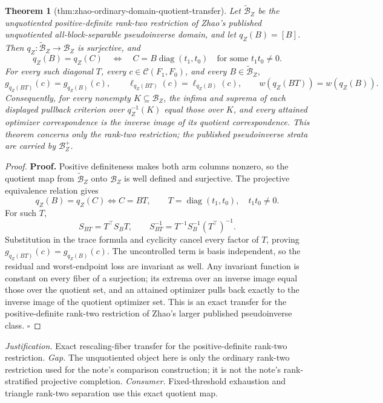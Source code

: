 \documentclass{article}
\newtheorem{theorem}{Theorem}
\begin{document}
\begin{theorem}[thm:zhao-ordinary-domain-quotient-transfer]\label{thm:zhao-ordinary-domain-quotient-transfer}
Let \(\widetilde{\mathcal B}_Z\) be the unquotiented positive-definite rank-two restriction of Zhao's published unquotiented all-block-separable pseudoinverse domain, and let \(q_Z(B)=[B]\).  Then \(q_Z:\widetilde{\mathcal B}_Z\to\mathcal B_Z\) is surjective, and
\[
q_Z(B)=q_Z(C)
\quad\Longleftrightarrow\quad
C=B\operatorname{diag}(t_1,t_0)
\quad\text{for some }t_1t_0\ne0.
\]
For every such diagonal \(T\), every \(c\in\mathcal C(F_1,F_0)\), and every \(B\in\widetilde{\mathcal B}_Z\),
\[
g_{q_Z(BT)}(c)=g_{q_Z(B)}(c),\qquad
\ell_{q_Z(BT)}(c)=\ell_{q_Z(B)}(c),\qquad
w(q_Z(BT))=w(q_Z(B)).
\]
Consequently, for every nonempty \(K\subseteq\mathcal B_Z\), the infima and suprema of each displayed pullback criterion over \(q_Z^{-1}(K)\) equal those over \(K\), and every attained optimizer correspondence is the inverse image of its quotient correspondence.  This theorem concerns only the rank-two restriction; the published pseudoinverse strata are carried by \(\mathcal B_Z^+\).
\end{theorem}
\begin{proof}
\textbf{Proof.}
Positive definiteness makes both arm columns nonzero, so the quotient map from \(\widetilde{\mathcal B}_Z\) onto \(\mathcal B_Z\) is well defined and surjective.  The projective equivalence relation gives
\[
q_Z(B)=q_Z(C)\Longleftrightarrow C=BT,
\qquad T=\operatorname{diag}(t_1,t_0),\quad t_1t_0\ne0.
\tag{1}
\]
For such \(T\),
\[
S_{BT}=T^\top S_BT,
\qquad S_{BT}^{-1}=T^{-1}S_B^{-1}(T^\top)^{-1}.
\tag{2}
\]
Substitution in the trace formula and cyclicity cancel every factor of \(T\), proving \(g_{q_Z(BT)}(c)=g_{q_Z(B)}(c)\).  The uncontrolled term is basis independent, so the residual and worst-endpoint loss are invariant as well.  Any invariant function is constant on every fiber of a surjection; its extrema over an inverse image equal those over the quotient set, and an attained optimizer pulls back exactly to the inverse image of the quotient optimizer set.  This is an exact transfer for the positive-definite rank-two restriction of Zhao's larger published pseudoinverse class. \(\square\)
\end{proof}
\par\smallskip\noindent \textit{Justification.} Exact rescaling-fiber transfer for the positive-definite rank-two restriction. \textit{Gap.} The unquotiented object here is only the ordinary rank-two restriction used for the note's comparison construction; it is not the note's rank-stratified projective completion. \textit{Consumer.} Fixed-threshold exhaustion and triangle rank-two separation use this exact quotient map.
\end{document}
